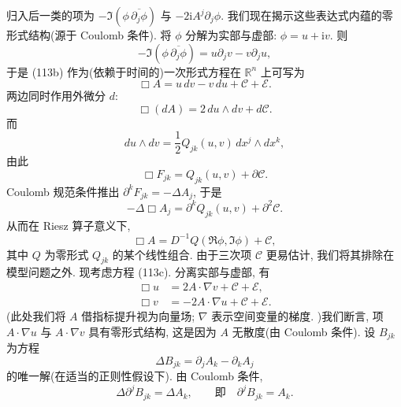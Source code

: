 归入后一类的项为 $-\Im(\phi\,\overline{\partial_j\phi})$ 与 $-2\mathrm{i}A^j\partial_j\phi$. 我们现在揭示这些表达式内蕴的零形式结构(源于 Coulomb 条件).
将 $\phi$ 分解为实部与虚部: $\phi=u+\mathrm{i}v$. 则
\begin{equation}
-\Im(\phi\,\overline{\partial_j\phi})=u\partial_j v-v\partial_j u,\end{equation}
于是 (113b) 作为(依赖于时间的)一次形式方程在 $\mathbb{R}^n$ 上可写为
\begin{equation}
\Box A=u\,dv-v\,du+\mathcal{C}+\mathcal{E}.\end{equation}
两边同时作用外微分 $d$:
\begin{equation}
\Box(dA)=2\,du\wedge dv+d\mathcal{C}.\end{equation}
而
\begin{equation}
du\wedge dv=\frac12 Q_{jk}(u,v)\,dx^j\wedge dx^k,\end{equation}
由此
\begin{equation}
\Box F_{jk}=Q_{jk}(u,v)+\partial\mathcal{C}.\end{equation}
Coulomb 规范条件推出 $\partial^k F_{jk}=-\Delta A_j$, 于是
\begin{equation}
-\Delta\Box A_j=\partial^k Q_{jk}(u,v)+\partial^2\mathcal{C}.\end{equation}
从而在 Riesz 算子意义下,
\begin{equation}
\Box A=D^{-1}Q(\Re\phi,\Im\phi)+\mathcal{C},\end{equation}
其中 $Q$ 为零形式 $Q_{jk}$ 的某个线性组合. 由于三次项 $\mathcal{C}$ 更易估计, 我们将其排除在模型问题之外.
现考虑方程 (113c). 分离实部与虚部, 有
\begin{equation}
\begin{aligned}
\Box u&=2A\cdot\nabla v+\mathcal{C}+\mathcal{E},\\
\Box v&=-2A\cdot\nabla u+\mathcal{C}+\mathcal{E}.\end{aligned}
\end{equation}
(此处我们将 $A$ 借指标提升视为向量场; $\nabla$ 表示空间变量的梯度. )我们断言, 项 $A\cdot\nabla u$ 与 $A\cdot\nabla v$ 具有零形式结构, 这是因为 $A$ 无散度(由 Coulomb 条件). 设 $B_{jk}$ 为方程
\begin{equation}
\Delta B_{jk}=\partial_j A_k-\partial_k A_j
\end{equation}
的唯一解(在适当的正则性假设下). 由 Coulomb 条件,
\begin{equation}
\Delta\partial^j B_{jk}=\Delta A_k,\qquad\text{即}\quad \partial^j B_{jk}=A_k.\end{equation}
